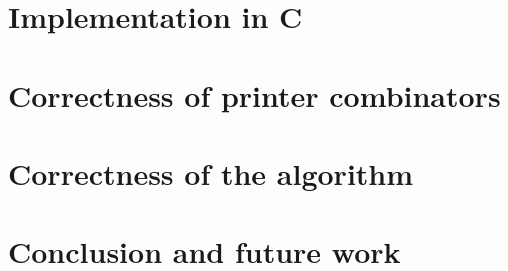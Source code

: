 \documentclass[14pt]{constructor-diploma}
\begin{document}
\section{Implementation in C}

\section{Correctness of printer combinators}

\section{Correctness of the algorithm}

\section*{Conclusion and future work}

\setmonofont[Mapping=tex-text]{CMU Typewriter Text}
% 
% 
\printbibliography
\end{document}
